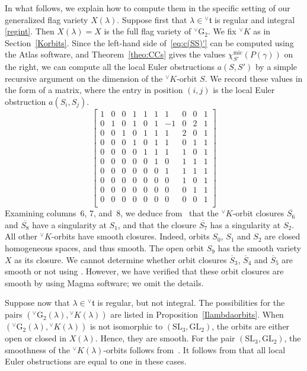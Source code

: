 \documentclass[a4paper, 11pt]{article}
\begin{document}
 
In what follows, we explain how to compute them in the specific
setting of our generalized flag variety \( X(\lambda) \). 
Suppose first that \( \lambda \in {^\vee}\mathfrak{t} \) is regular
and integral \eqref{regint}.   
Then \( X(\lambda) = X \) is the full flag variety of \(
{}^{\vee}\mathrm{G}_2 \).   
We fix \( {}^{\vee}K \) as in Section~\ref{Korbits}. Since the
left-hand side of~\eqref{eq:c(SS)'} can be computed using
the Atlas software, and  Theorem~\ref{theo:CCs} gives
the values  $\chi_{S'}^{\mathrm{mic}}(P(\gamma))$ on the right, we
can compute all the local Euler 
obstructions $a(S, S')$ by a simple recursive argument on the
dimension of the ${}^{\vee}K$-orbit $S$. 
We record these values in the form of a matrix, where the entry in
position $(i,j)$ is the local Euler obstruction $a(S_i, S_j)$. 
\[
\begin{bmatrix}
1 & 0 & 0 & 1 & 1 & 1 & 1 & 0 & 0 & 1 \\
0 & 1 & 0 & 1 & 0 & 1 & -1 & 0 & 2 & 1 \\
0 & 0 & 1 & 0 & 1 & 1 & 1 & 2 & 0 & 1 \\
0 & 0 & 0 & 1 & 0 & 1 & 1 & 0 & 1 & 1 \\
0 & 0 & 0 & 0 & 1 & 1 & 1 & 1 & 0 & 1 \\
0 & 0 & 0 & 0 & 0 & 1 & 0 & 1 & 1 & 1 \\
0 & 0 & 0 & 0 & 0 & 0 & 1 & 1 & 1 & 1 \\
0 & 0 & 0 & 0 & 0 & 0 & 0 & 1 & 0 & 1 \\
0 & 0 & 0 & 0 & 0 & 0 & 0 & 0 & 1 & 1 \\
0 & 0 & 0 & 0 & 0 & 0 & 0 & 0 & 0 & 1 \\
\end{bmatrix} 
\]
Examining columns~6, 7, and~8, we deduce
from~\cite[Example~1]{Kashiwara73} that the ${}^{\vee}K$-orbit
closures $\overline{S_6}$ and $\overline{S_8}$ have a singularity at
$S_1$, and that the closure $\overline{S_7}$ has a singularity at
$S_2$. 
All other ${}^{\vee}K$-orbits have smooth closures. Indeed, orbits $S_{0}$,
$S_{1}$  and $S_{2}$ are closed homogeneous spaces, and thus
smooth. The open orbit $S_{9}$ has the smooth variety $X$ as its closure. 
We cannot determine whether orbit closures
$\overline{S}_{3}$, $\overline{S}_{4}$ and $\overline{S}_{5}$ are
smooth or not using \cite[Example~1]{Kashiwara73}.  
However, we have verified that these orbit closures are smooth
by using Magma software; we omit the details. 

Suppose now that \( \lambda \in {^\vee}\mathfrak{t} \) is regular, but not
integral.  The possibilities for the pairs
\(\left({}^{\vee}\mathrm{G}_2(\lambda), {}^{\vee}K(\lambda)\right)\)
are listed in Proposition~\ref{Ilambdaorbits}.  When
\(\left({}^{\vee}\mathrm{G}_2(\lambda), {}^{\vee}K(\lambda)\right)\)
is not isomorphic to  \((\mathrm{SL}_3, \mathrm{GL}_2)\), the orbits
are either open or closed in $X(\lambda)$.  Hence, they are smooth.
For the pair \( (\mathrm{SL}_3, \mathrm{GL}_2) \), the smoothness of
the \( {}^{\vee}K(\lambda) \)-orbits follows from~\cite[Theorem
  7.3.3]{McGovern2023}.  
It follows from \cite[Example~1]{Kashiwara73} that
all local Euler obstructions are equal to one
in these cases. 
\end{document}
